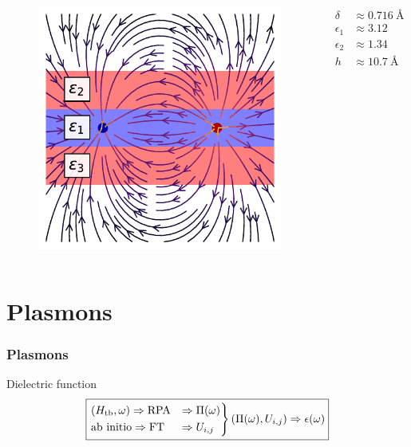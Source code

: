 \documentclass{beamer}
\begin{document}
\begin{frame}
\begin{columns}
\begin{figure}
        \includegraphics[width=\textwidth]{img/FSG_hBN.pdf}
    \end{figure}
    \begin{equation*}
    \begin{split}
        \delta &\approx \SI{0.716}{\angstrom}\\
        \epsilon_1 &\approx 3.12\\
        \epsilon_2 &\approx 1.34\\
        h &\approx \SI{10.7}{\angstrom}
    \end{split}
    \end{equation*}
    \end{columns}
\end{frame}


\section{Plasmons}
\begin{frame}
    \frametitle{Plasmons}
    \begin{block}{Dielectric function}
    \begin{equation}
        \boxed{\begin{rcases}
        (H_{\text{tb}},\omega)\Rightarrow \text{RPA} &\Rightarrow \Pi(\omega)\\
        \text{ab initio}\Rightarrow \text{FT} &\Rightarrow U_{i,j}
        \end{rcases} (\Pi(\omega),U_{i,j}) \Rightarrow \epsilon(\omega) }
    \end{equation}
    \end{block}
\end{frame}
\end{document}
